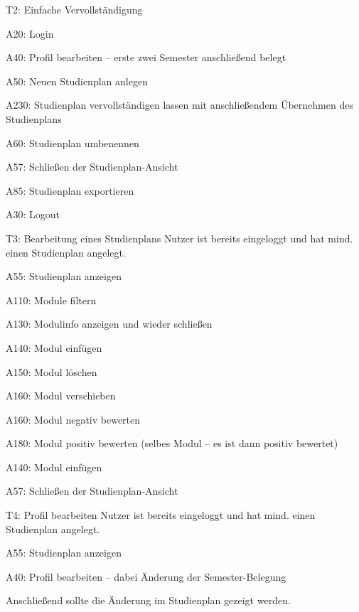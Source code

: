 \begin{scenario}{T2: Einfache Vervollständigung}
	\item A20: Login
	\item A40: Profil bearbeiten – erste zwei Semester anschließend belegt
	\item A50: Neuen Studienplan anlegen
	\item A230: Studienplan vervollständigen lassen mit anschließendem Übernehmen des {Studienplans}
	\item A60: Studienplan umbenennen 
	\item A57: Schließen der Studienplan-Ansicht
	\item A85: Studienplan exportieren
	\item A30: Logout
\end{scenario}

\begin{scenario*}{T3: Bearbeitung eines Studienplans}
	{{Nutzer} ist bereits eingeloggt und hat mind. einen {Studienplan} angelegt.}
	\item A55: Studienplan anzeigen
	\item A110: Module filtern 
	\item A130: Modulinfo anzeigen und wieder schließen
	\item A140: Modul einfügen
	\item A150: Modul löschen
	\item A160: Modul verschieben
	\item A160: Modul negativ bewerten
	\item A180: Modul positiv bewerten (selbes {Modul} – es ist dann positiv bewertet) 
	\item A140: Modul einfügen
	\item A57: Schließen der Studienplan-Ansicht
\end{scenario*}

\begin{scenario*}{T4: Profil bearbeiten}
	{{Nutzer} ist bereits eingeloggt und hat mind. einen {Studienplan} angelegt.}
	\item A55: Studienplan anzeigen
	\item A40: Profil bearbeiten – dabei Änderung der Semester-Belegung
	\item Anschließend sollte die Änderung im Studienplan gezeigt werden.
\end{scenario*}

